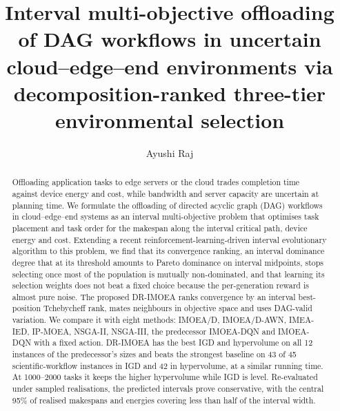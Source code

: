 \documentclass[a4paper,fleqn]{cas-dc}
\newcommand{\ours}{DR-IMOEA}   %
\newcommand{\todo}[1]{\textbf{[TODO: #1]}}
\begin{document}
\let\WriteBookmarks\relax
\def\floatpagepagefraction{1}
\def\textpagefraction{.001}


\title [mode = title]{Interval multi-objective offloading of DAG workflows in uncertain cloud--edge--end
  environments via decomposition-ranked three-tier environmental selection}

\author[1]{Ayushi Raj}
\cormark[1]

\begin{abstract}
Offloading application tasks to edge servers or the cloud trades completion time against device energy and cost, while
bandwidth and server capacity are uncertain at planning time. We formulate the offloading of directed acyclic graph
(DAG) workflows in cloud--edge--end systems as an interval multi-objective problem that optimises task placement and
task order for the makespan along the interval critical path, device energy and cost. Extending a recent
reinforcement-learning-driven interval evolutionary algorithm to this problem, we find that its convergence ranking, an
interval dominance degree that at its threshold amounts to Pareto dominance on interval midpoints, stops selecting once
most of the population is mutually non-dominated, and that learning its selection weights does not beat a fixed choice
because the per-generation reward is almost pure noise. The proposed \ours{} ranks convergence by an interval
best-position Tchebycheff rank, mates neighbours in objective space and uses DAG-valid variation. We compare it with
eight methods: IMOEA/D, IMOEA/D-AWN, IMEA-IED, IP-MOEA, NSGA-II, NSGA-III, the predecessor IMOEA-DQN and IMOEA-DQN
with a fixed action. \ours{} has the best IGD and hypervolume on all 12 instances of the predecessor's sizes and beats
the strongest baseline on 43 of 45 scientific-workflow instances in IGD and 42 in hypervolume, at a similar running
time. At 1000--2000 tasks it keeps the higher hypervolume while IGD is level. Re-evaluated under sampled realisations,
the predicted intervals prove conservative, with the central 95\% of realised makespans and energies covering less
than half of the interval width.
\end{abstract}
\end{document}
